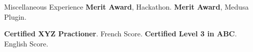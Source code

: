 \begin{rubric}{Miscellaneous Experience}
    \entry*[2002] \textbf{Merit Award}, Hackathon.
    \entry*[2002] \textbf{Merit Award}, Medusa Plugin.

    \entry*[2014] \textbf{Certified XYZ Practioner}. French Score.
    \entry*[2006] \textbf{Certified Level 3 in ABC}. English Score.

\end{rubric}